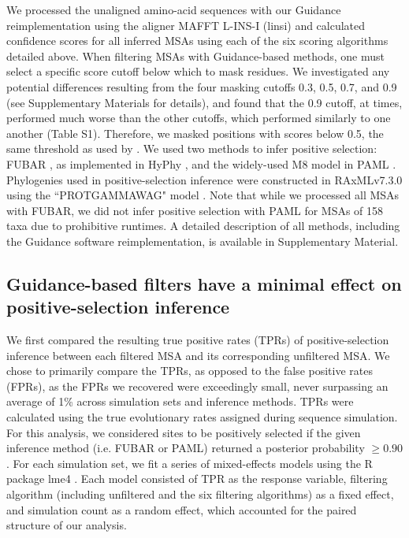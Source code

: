 \documentclass[11pt]{article}
\begin{document}
We processed the unaligned amino-acid sequences with our Guidance reimplementation using the aligner MAFFT L-INS-I (linsi) \citep{Katoh2002,Katoh2005} and calculated confidence scores for all inferred MSAs using each of the six scoring algorithms detailed above. When filtering MSAs with Guidance-based methods, one must select a specific score cutoff below which to mask residues. We investigated any potential differences resulting from the four masking cutoffs 0.3, 0.5, 0.7, and 0.9 (see Supplementary Materials for details), and found that the 0.9 cutoff, at times, performed much worse than the other cutoffs, which performed similarly to one another (Table S1). Therefore, we masked positions with scores below 0.5, the same threshold as used by \citet{Jordan2012}. We used two methods to infer positive selection: FUBAR \citep{Murrell2013}, as implemented in HyPhy \citep{Pond2005}, and the widely-used M8 model in PAML \citep{Yang2000, Yang2007}. Phylogenies used in positive-selection inference were constructed in RAxMLv7.3.0 using the ``PROTGAMMAWAG" model \citep{Stamatakis2006}.  Note that while we processed all MSAs with FUBAR, we did not infer positive selection with PAML for MSAs of 158 taxa due to prohibitive runtimes. A detailed description of all methods, including the Guidance software reimplementation, is available in Supplementary Material.


\subsection*{Guidance-based filters have a minimal effect on positive-selection inference}

We first compared the resulting true positive rates (TPRs) of positive-selection inference between each filtered MSA and its corresponding unfiltered MSA. We chose to primarily compare the TPRs, as opposed to the false positive rates (FPRs), as the FPRs we recovered were exceedingly small, never surpassing an average of 1\% across simulation sets and inference methods. TPRs were calculated using the true evolutionary rates assigned during sequence simulation. For this analysis, we considered sites to be positively selected if the given inference method (i.e. FUBAR or PAML) returned a posterior probability $\geq0.90$. For each simulation set, we fit a series of mixed-effects models using the R package lme4 \citep{Bates2012}. Each model consisted of TPR as the response variable, filtering algorithm (including unfiltered and the six filtering algorithms) as a fixed effect, and simulation count as a random effect, which accounted for the paired structure of our analysis. 
\end{document}
